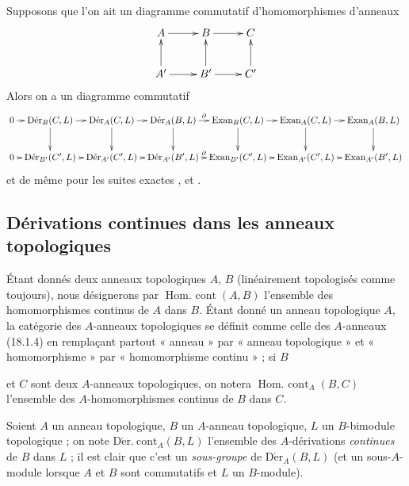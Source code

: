 \begin{remark}[20.2.5]
\label{0.20.2.5-fr}
Supposons que l'on ait un diagramme commutatif d'homomorphismes d'anneaux
\[
\xymatrix{
  A \ar[r] & B \ar[r] & C \\
  A' \ar[u] \ar[r] & B' \ar[u] \ar[r] & C' \ar[u]
}
\]
Alors on a un diagramme commutatif
\[
\xymatrix@C=0.5em{
  0 \ar[r] & \operatorname{D\acute{e}r}_B(C,L) \ar[r] \ar[d] &
  \operatorname{D\acute{e}r}_A(C,L) \ar[r] \ar[d] &
  \operatorname{D\acute{e}r}_A(B,L) \ar[r]^-\partial \ar[d] &
  \operatorname{Exan}_B(C,L) \ar[r] \ar[d] &
  \operatorname{Exan}_A(C,L) \ar[r] \ar[d] &
  \operatorname{Exan}_A(B,L) \ar[d] \\
  0 \ar[r] & \operatorname{D\acute{e}r}_{B'}(C',L) \ar[r] &
  \operatorname{D\acute{e}r}_{A'}(C',L) \ar[r] &
  \operatorname{D\acute{e}r}_{A'}(B',L) \ar[r]^-\partial &
  \operatorname{Exan}_{B'}(C',L) \ar[r] &
  \operatorname{Exan}_{A'}(C',L) \ar[r] &
  \operatorname{Exan}_{A'}(B',L)
}
\]
et de même pour les suites exactes ,
 et .
\end{remark}

\subsection{Dérivations continues dans les anneaux topologiques}
\label{subsection:0.20.3-fr}

\begin{env}[20.3.1]
\label{0.20.3.1-fr}
Étant donnés deux anneaux topologiques $A$, $B$ (linéairement topologisés
comme toujours), nous désignerons par $\operatorname{Hom.\ cont}(A,B)$
l'ensemble des homomorphismes continus de $A$ dans $B$. Étant donné un anneau
topologique $A$, la catégorie des $A$-anneaux topologiques se définit comme
celle des $A$-anneaux (18.1.4) en remplaçant partout « anneau » par « anneau
topologique » et « homomorphisme » par « homomorphisme continu » ; si $B$

et $C$ sont deux $A$-anneaux topologiques, on notera
$\operatorname{Hom.\ cont}_A(B,C)$ l'ensemble des $A$-homomorphismes continus
de $B$ dans $C$.

Soient $A$ un anneau topologique, $B$ un $A$-anneau topologique, $L$ un
$B$-bimodule topologique ; on note $\operatorname{D\acute{e}r.\ cont}_A(B,L)$
l'ensemble des $A$-dérivations \emph{continues} de $B$ dans $L$ ; il est clair
que c'est un \emph{sous-groupe} de $\operatorname{D\acute{e}r}_A(B,L)$ (et un
sous-$A$-module lorsque $A$ et $B$ sont commutatifs et $L$ un $B$-module).
\end{env}

